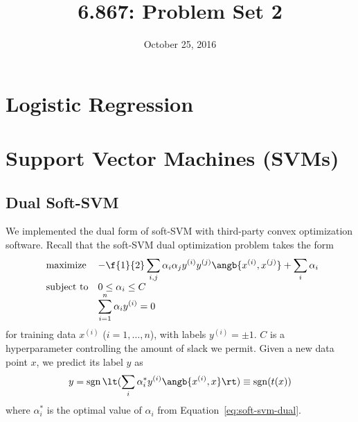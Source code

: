 \documentclass{article}
\title{6.867: Problem Set 2}
\date{October 25, 2016}
\DeclareMathOperator{\sgn}{sgn}
\newcommand{\sind}[1]{^{(#1)}}
\begin{document}
\maketitle

\begin{multicols}{2}


\section{Logistic Regression}




\section{Support Vector Machines (SVMs)}

\subsection{Dual Soft-SVM}

We implemented the dual form of soft-SVM
with third-party convex optimization software.
Recall that the soft-SVM dual optimization problem takes the form
\begin{equation}
    \label{eq:soft-svm-dual}
    \begin{array}{ll@{}ll}
        \text{maximize}  &\displaystyle -\f{1}{2}\sum_{i,j} \alpha_i \alpha_j y\sind{i} y\sind{j} \angb{x\sind{i}, x\sind{j}}
        +
        \sum_i \alpha_i \\
        \text{subject to}& 0 \le \alpha_i \le C\\
        & \displaystyle\sum_{i=1}^n \alpha_i y\sind{i} = 0
    \end{array}
\end{equation}
for training data $x\sind{i}$ ($i=1, \dots, n$),
with labels $y\sind i = \pm 1$.
$C$ is a hyperparameter controlling the amount of slack we permit.
Given a new data point $x$,
we predict its label $y$ as
\begin{equation}
    \label{eq:soft-svm-predict}
    y = \sgn\lt(\sum_i \alpha^*_i y\sind{i} \angb{x\sind{i}, x}\rt) \equiv \sgn(t(x))
\end{equation}
where $\alpha^*_i$ is the optimal value of $\alpha_i$
from Equation~\ref{eq:soft-svm-dual}.


\end{multicols}
\end{document}
